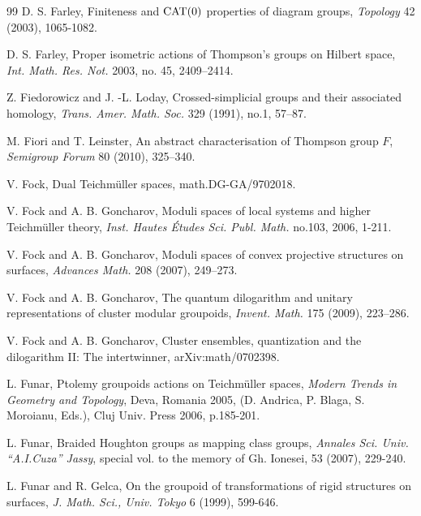 \documentclass[twoside]{irmaems}
\theoremstyle{plain}
\theoremstyle{definition}
\theoremstyle{remark}
\begin{document}
\begin{small}
\begin{thebibliography}{99}
D. S. Farley, {  Finiteness and $\rm CAT(0)$ 
properties of diagram groups},  {\em  Topology}  42 (2003),  1065-1082. 

D. S. Farley,  Proper isometric actions of Thompson's groups on Hilbert space,   {\em Int. Math. Res. Not.}  2003,  no. 45, 2409--2414.


Z. Fiedorowicz and J. -L. Loday,
Crossed-simplicial groups and their associated homology,
{\em Trans. Amer. Math. Soc.} 329 (1991), no.1, 57--87.



M. Fiori and T. Leinster, An abstract characterisation of Thompson group $F$,
 {\em Semigroup Forum} 80 (2010), 325--340. 

V. Fock, {Dual Teichm\"uller spaces}, math.DG-GA/9702018.



V. Fock and A. B. Goncharov, {Moduli spaces of local systems 
and higher Teichm\"uller theory}, {\em Inst. Hautes \'Etudes Sci. Publ. Math.} no.103, 2006, 1-211. 

V. Fock and A. B. Goncharov, {Moduli spaces of convex projective structures 
on surfaces}, {\em Advances Math. }  208 (2007),  249--273. 
 
V. Fock and A. B. Goncharov, { The quantum dilogarithm and unitary 
representations of cluster modular groupoids}, 
{\em Invent. Math. } 175 (2009),   223--286. 

V. Fock and A. B. Goncharov, { Cluster ensembles, quantization and the dilogarithm II: The intertwinner}, arXiv:math/0702398. 


L. Funar, { Ptolemy groupoids actions on Teichm\"uller spaces}, 
{\em Modern Trends in Geometry and Topology}, Deva, Romania 2005, (D. Andrica, P. Blaga, 
S. Moroianu, Eds.), Cluj Univ. Press 2006, p.185-201.







L. Funar, {
Braided Houghton groups as mapping class groups},  {\em 
Annales Sci. Univ. ``A.I.Cuza'' Jassy}, special vol. to the memory of Gh. Ionesei, 53 (2007), 229-240.

L. Funar and R. Gelca, { On the groupoid of transformations of 
rigid  structures on surfaces},          
{\em J. Math. Sci., Univ. Tokyo} 6 (1999), 599-646.         
             


\end{thebibliography}
\end{small}
\end{document}
